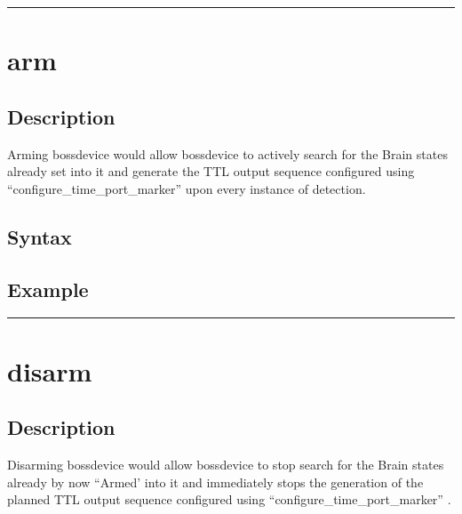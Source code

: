 \documentclass[letterpaper,10pt,english]{sphinxmanual}
\begin{document}
\bigskip\hrule\bigskip



\section{arm}
\label{\detokenize{4_api_documentation:arm}}

\subsection{Description}
\label{\detokenize{4_api_documentation:id42}}
\sphinxAtStartPar
Arming bossdevice would allow bossdevice to actively search for the Brain states already set into it and generate the TTL output sequence configured using “configure\_time\_port\_marker” upon every instance of detection.


\subsection{Syntax}
\label{\detokenize{4_api_documentation:id43}}
\begin{sphinxVerbatim}[commandchars=\\\{\}]
\end{sphinxVerbatim}


\subsection{Example}
\label{\detokenize{4_api_documentation:id44}}
\begin{sphinxVerbatim}[commandchars=\\\{\}]
\end{sphinxVerbatim}


\bigskip\hrule\bigskip



\section{disarm}
\label{\detokenize{4_api_documentation:disarm}}

\subsection{Description}
\label{\detokenize{4_api_documentation:id45}}
\sphinxAtStartPar
Disarming bossdevice would allow bossdevice to stop search for the Brain states already by now “Armed’ into it and immediately stops the generation of the planned TTL output sequence configured using “configure\_time\_port\_marker” .
\end{document}
